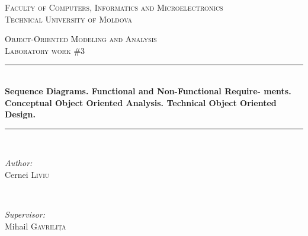 \documentclass[12pt,a4paper,titlepage]{article}
\begin{document}
\begin{titlepage}

  \begin{center} %

  \textsc{\large Faculty of Computers, Informatics and Microelectronics}\\[0.5cm]
  \textsc{\large Technical University of Moldova}\\[1.2cm] %
  \vspace{25 mm}

  \textsc{\Large Object-Oriented Modeling and Analysis}\\[0.5cm] %
  \textsc{\large Laboratory work \#3}\\[0.5cm] %

\newcommand{\HRule}{\rule{\linewidth}{0.5mm}} %

  \vspace{10 mm}
  \HRule \\[0.4cm]
  { \LARGE \bfseries Sequence Diagrams. Functional and Non-Functional Require-
ments. Conceptual Object Oriented Analysis. Technical Object Oriented Design. }\\[0.4cm] %
  \HRule \\[1.5cm]

      \vspace{30mm}

      \begin{minipage}{0.4\textwidth}
      \begin{flushleft} \large
      \emph{Author:}\\
      Cernei \textsc{Liviu}
      \end{flushleft}
      \end{minipage}
      ~
      \begin{minipage}{0.4\textwidth}
      \begin{flushright} \large
      \emph{Supervisor:} \\
      Mihail \textsc{Gavrilița} %
      \end{flushright}
      \end{minipage}\\[4cm]


\end{center}
\end{titlepage}
\end{document}
